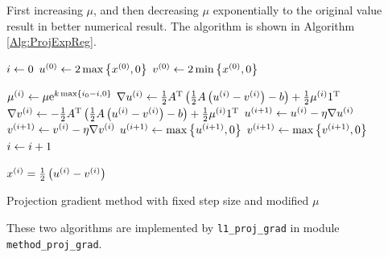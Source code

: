 \documentclass[english]{pkupaper}
\begin{document}
\begin{thmquestion}[3 (a)]
First increasing $\mu$, and then decreasing $\mu$ exponentially to the original value result in better numerical result. The algorithm is shown in Algorithm \ref{Alg:ProjExpReg}.

\begin{algorithm}
\SetAlgoLined


$ i \leftarrow 0 $\;
$ u^{\left( 0 \right)} \leftarrow 2 \max \left\{  x^{\left( 0 \right)}, 0  \right\} $\;
$ v^{\left( 0 \right)} \leftarrow 2 \min \left\{  x^{\left( 0 \right)}, 0  \right\} $\;

{
	$ \mu^{\left( i \right)} \leftarrow \mu \mathrm{e}^{ k \max \left\{  i_0 - i, 0  \right\} } $\; 
	$ \nabla u^{\left( i \right)} \leftarrow \frac{1}{2} A^{\mathrm{T}} \left(  \frac{1}{2} A \left(  u^{\left( i \right)} - v^{\left( i \right)}  \right) - b  \right) + \frac{1}{2} \mu^{\left( i \right)} 1^{\mathrm{T}} $\;
	$ \nabla v^{\left( i \right)} \leftarrow -\frac{1}{2} A^{\mathrm{T}} \left(  \frac{1}{2} A \left(  u^{\left( i \right)} - v^{\left( i \right)}  \right) - b  \right) + \frac{1}{2} \mu^{\left( i \right)} 1^{\mathrm{T}} $\;
	$ u^{\left(  i + 1  \right)} \leftarrow u^{\left( i \right)} - \eta \nabla u^{\left( i \right)} $\;
	$ v^{\left(  i + 1  \right)} \leftarrow v^{\left( i \right)} - \eta \nabla v^{\left( i \right)} $\;
	$ u^{\left(  i + 1  \right)} \leftarrow \max \left\{  u^{\left(  i + 1  \right)}, 0  \right\} $\;
	$ v^{\left(  i + 1  \right)} \leftarrow \max \left\{  v^{\left(  i + 1  \right)}, 0  \right\} $\;
	$ i \leftarrow i + 1 $\;
}

$ x^{\left( i \right)} = \frac{1}{2} \left(  u^{\left( i \right)} - v^{\left( i \right)}  \right) $\;

\caption{Projection gradient method with fixed step size and modified $\mu$} \label{Alg:ProjExpReg}
\end{algorithm}

These two algorithms are implemented by \verb"l1_proj_grad" in module \verb"method_proj_grad".
\end{thmquestion}
\end{document}
